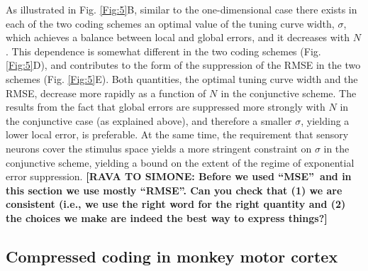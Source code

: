 \documentclass[a4paper]{article}%
\begin{document}
As illustrated in Fig. \ref{Fig:5}B, similar to the one-dimensional case there
exists in each of the two coding schemes an optimal value of the tuning curve
width, $\sigma$, which achieves a balance between local and global errors, and
it decreases with $N$. This dependence is somewhat different in the two coding
schemes (Fig. \ref{Fig:5}D), and contributes to the form of the suppression of
the RMSE in the two schemes (Fig. \ref{Fig:5}E). Both quantities, the optimal
tuning curve width and the RMSE, decrease more rapidly as a function of
$N\,\ $in the conjunctive scheme. The results from the fact that global errors
are suppressed more strongly with \thinspace$N$ in the conjunctive case (as
explained above), and therefore a smaller $\sigma$, yielding a lower local
error, is preferable. At the same time, the requirement that sensory neurons
cover the stimulus space yields a more stringent constraint on $\sigma$ in the
conjunctive scheme, yielding a bound on the extent of the regime of
exponential error suppression. \textbf{[RAVA TO SIMONE: Before we used
\textquotedblleft MSE\textquotedblright\ and in this section we use mostly
\textquotedblleft RMSE\textquotedblright. Can you check that (1) we are
consistent (i.e., we use the right word for the right quantity and (2) the
choices we make are indeed the best way to express things?]}

\subsection*{Compressed coding in monkey motor cortex}

\label{Sec:data}
\end{document}
